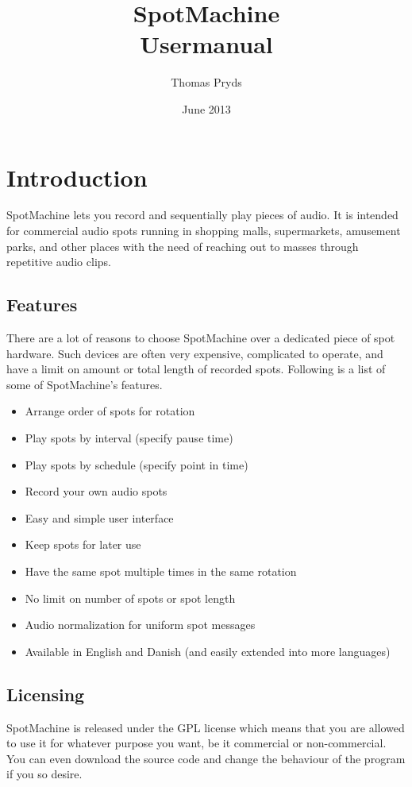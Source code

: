 \documentclass[a4paper,12pt]{report}
\title{SpotMachine \\ Usermanual}
\author{Thomas Pryds}
\date{June 2013}
\begin{document}
\maketitle

\tableofcontents

\chapter{Introduction}

SpotMachine lets you record and sequentially play pieces of audio. It is
intended for commercial audio spots running in shopping malls, supermarkets,
amusement parks, and other places with the need of reaching out to masses
through repetitive audio clips.

\section{Features}
There are a lot of reasons to choose SpotMachine over a dedicated piece of spot
hardware. Such devices are often very expensive, complicated to operate, and
have a limit on amount or total length of recorded spots. Following is a list of
some of SpotMachine's features.

\begin{itemize}
\item Arrange order of spots for rotation
\item Play spots by interval (specify pause time)
\item Play spots by schedule (specify point in time)
\item Record your own audio spots
\item Easy and simple user interface
\item Keep spots for later use
\item Have the same spot multiple times in the same rotation
\item No limit on number of spots or spot length
\item Audio normalization for uniform spot messages
\item Available in English and Danish (and easily extended into more languages)
\end{itemize}

\section{Licensing}
SpotMachine is released under the GPL license which means that you are allowed
to use it for whatever purpose you want, be it commercial or non-commercial. You
can even download the source code and change the behaviour of the program if you
so desire.
\end{document}

